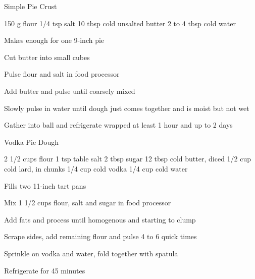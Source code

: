 \begin{recipe}{Simple Pie Crust}{}
\begin{ingredients}
150 g flour
1/4 tsp salt
10 tbsp cold unsalted butter
2 to 4 tbsp cold water
\end{ingredients}
\nextcolumn
Makes enough for one 9-inch pie
\begin{steps}
    \item Cut butter into small cubes
    \item Pulse flour and salt in food processor
    \item Add butter and pulse until coarsely mixed
    \item Slowly pulse in water until dough just comes together and is moist but not wet
    \item Gather into ball and refrigerate wrapped at least 1 hour and up to 2 days
\end{steps}
\end{recipe}

\begin{recipe}{Vodka Pie Dough}{}
\begin{ingredients}
2 1/2 cups flour
1 tsp table salt
2 tbsp sugar
12 tbsp cold butter, diced
1/2 cup cold lard, in chunks
1/4 cup cold vodka
1/4 cup cold water
\end{ingredients}
\nextcolumn
Fills two 11-inch tart pans
\begin{steps}
    \item Mix 1 1/2 cups flour, salt and sugar in food processor
    \item Add fats and process until homogenous and starting to clump
    \item Scrape sides, add remaining flour and pulse 4 to 6 quick times
    \item Sprinkle on vodka and water, fold together with spatula
    \item Refrigerate for 45 minutes
\end{steps}
\end{recipe}

